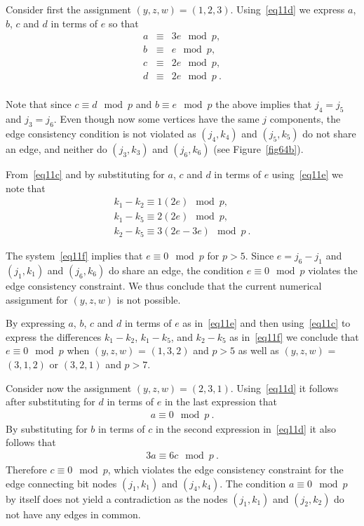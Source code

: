 Consider first the assignment $(y,z,w)=(1,2,3)$.
Using~\eqref{eq11d} we express $a$, $b$, $c$ and $d$ in terms of
$e$ so that
\begin{equation}\label{eq11e}\begin{array}{cccc}
a &\equiv & 3e \mod p, \\
b &\equiv & e \mod p, \\
c &\equiv & 2e \mod p, \\
d &\equiv & 2e \mod p~. \\
\end{array}\end{equation}

Note that since $c \equiv d \mod p$ and  $b \equiv e \mod p$ the
above implies that $j_4=j_5$ and $j_3=j_6$. Even though now some
vertices have the same $j$ components, the edge consistency
condition is not violated as $(j_4,k_4)$ and $(j_5,k_5)$ do not
share an edge, and neither do $(j_3,k_3)$ and $(j_6,k_6)$ (see
Figure~\ref{fig64b}).

From~\eqref{eq11c} and by substituting for $a$, $c$ and $d$ in
terms of $e$ using~\eqref{eq11e} we note that
\begin{equation}\label{eq11f}\begin{array}{cccc}
k_1-k_2 \equiv 1(2e) \mod p, \\
k_1-k_5 \equiv 2(2e) \mod p, \\
k_2-k_5 \equiv 3(2e-3e) \mod p~.
\end{array}\end{equation}

The system~\eqref{eq11f} implies that $e \equiv 0 \mod p$ for
$p>5$. Since $e=j_6-j_1$ and $(j_1,k_1)$ and $(j_6,k_6)$ do share
an edge, the condition $e \equiv 0 \mod p$ violates the edge
consistency constraint. We thus conclude that the current
numerical assignment for $(y,z,w)$ is not possible.

By expressing $a$, $b$, $c$ and $d$ in terms of $e$ as
in~\eqref{eq11e} and then using~\eqref{eq11c} to express the
differences $k_1-k_2$, $k_1-k_5$, and $k_2-k_5$ as
in~\eqref{eq11f} we conclude that $e \equiv 0 \mod p$ when
$(y,z,w)$ = $(1,3,2)$ and $p>5$ as well as $(y,z,w)$ = $(3,1,2)$
or $(3,2,1)$ and $p>7$.

Consider now the assignment $(y,z,w)=(2,3,1)$. Using~\eqref{eq11d}
it follows after substituting for $d$ in terms of $e$ in the last
expression that
\begin{eqnarray}
a \equiv 0 \mod p~.
\end{eqnarray}
By substituting for $b$ in terms of $c$ in the second expression
in~\eqref{eq11d} it also follows that
\begin{eqnarray}
3a \equiv 6c \mod p~.
\end{eqnarray}
Therefore $c \equiv 0 \mod p$, which violates the edge consistency
constraint for the edge connecting bit nodes $(j_1,k_1)$ and
$(j_4,k_4)$. The condition $a \equiv 0 \mod p$ by itself does not
yield a contradiction as the nodes $(j_1,k_1)$ and $(j_2,k_2)$ do
not have any edges in common.

